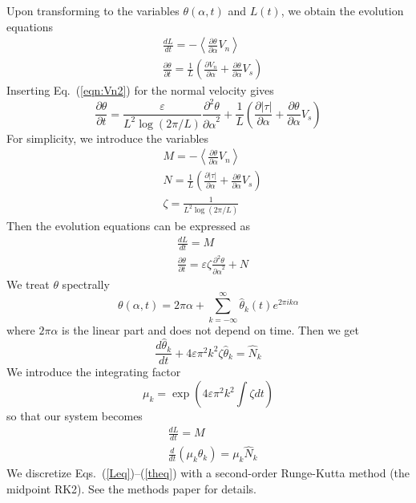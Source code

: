\documentclass[11pt]{article}
\newcommand{\ppd}[2]  { \frac{\partial^2 #1}{{\partial #2}^2} }
\newcommand{\abs}[1]{\left| #1 \right|}
\newcommand{\mean}[1]{\left< #1 \right>}
\newcommand{\eps}{\varepsilon}
\newcommand{\atau}{\abs{\tau}}
\newcommand{\pderiv}[2]{\frac{\partial #1}{\partial #2}}
\newcommand{\tderiv}[2]{\frac{d #1}{d #2}}
\newcommand{\Vn}{V_n}
\newcommand{\Vs}{V_s}
\newcommand{\thalpha}{\pderiv{\theta}{\alpha}}
\newcommand{\elfun}{\zeta}
\newcommand{\thhat}{\hat{\theta}}
\begin{document}
Upon transforming to the variables $\theta(\alpha,t)$ and $L(t)$, we obtain the evolution equations
\begin{align}
& \tderiv{L}{t} = - \mean{\thalpha \Vn} \\
& \pderiv{\theta}{t} = \frac{1}{L} \left( \pderiv{\Vn}{\alpha} + \thalpha \Vs \right)
\end{align}
Inserting Eq.~(\ref{eqn:Vn2}) for the normal velocity gives
\begin{equation}
\pderiv{\theta}{t} = \frac{\eps}{L^{2} \log \left(2\pi/L \right)} \ppd{\theta}{\alpha} 
+ \frac{1}{L} \left( \pderiv{\atau}{\alpha} + \thalpha \Vs \right)
\end{equation}
For simplicity, we introduce the variables
\begin{align}
& M = - \mean{\thalpha \Vn} \\
& N = \frac{1}{L} \left( \pderiv{\atau}{\alpha} + \thalpha \Vs \right) \\
& \elfun = \frac{1}{L^{2} \log \left(2\pi/L \right)}
\end{align}
Then the evolution equations can be expressed as
\begin{align}
& \tderiv{L}{t} = M \\
& \pderiv{\theta}{t} = \eps \elfun \ppd{\theta}{\alpha} + N
\end{align}
We treat $\theta$ spectrally
\begin{equation}
\theta(\alpha,t) = 2 \pi \alpha + \sum_{k = -\infty}^{\infty} \thhat_k(t) e^{2\pi i k \alpha}
\end{equation}
where $2 \pi \alpha$ is the linear part and does not depend on time. Then we get
\begin{equation}
\label{thODEs}
\tderiv{\thhat_k}{t} +  4 \eps \pi^2 k^2  \elfun \thhat_k = \hat{N}_k
\end{equation}
We introduce the integrating factor
\begin{equation}
\mu_k = \exp \left( 4 \eps \pi^2 k^2 \int \elfun dt \right)
\end{equation}
so that our system becomes
\begin{align}
\label{Leq}
& \tderiv{L}{t} = M \\
\label{theq}
& \tderiv{}{t}\left( \mu_k \theta_k \right) = \mu_k \hat{N}_k
\end{align}
We discretize Eqs.~(\ref{Leq})--(\ref{theq}) with a second-order Runge-Kutta method (the midpoint RK2). See the methods paper for details.
\end{document}
